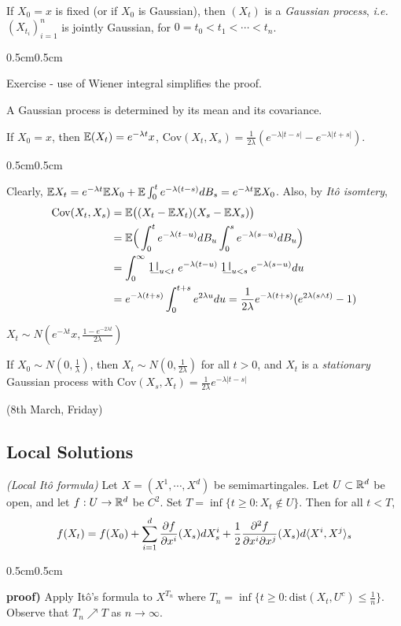 \documentclass[12pt,a4paper]{article}
\newenvironment{proof}
{\begin{changemargin}{0.5cm}{0.5cm} 
	}%
	{\end{changemargin}
}
\newenvironment{p}
{\begin{proof} 
	}%
	{\end{proof}
}
\begin{document}
\fact If $X_0 =x$ is fixed (or if $X_0$ is Gaussian), then $(X_t)$ is a \emph{Gaussian process}, \textit{i.e.} $(X_{t_i})_{i=1}^n$ is jointly Gaussian, for $0=t_0 < t_1 <\cdots <t_n$.
\begin{p}
\pf Exercise - use of Wiener integral simplifies the proof.
\end{p}
\s

A Gaussian process is determined by its mean and its covariance.
\s

\fact If $X_0 =x$, then $\mathbb{E}(X_t) = e^{-\lambda t} x$, $\text{Cov}(X_t, X_s) = \frac{1}{2\lambda} (e^{-\lambda |t-s|}- e^{-\lambda |t+s|})$.
\begin{p}
\pf Clearly, $\mathbb{E} X_t = e^{-\lambda t} \mathbb{E} X_0 + \mathbb{E} \int_0^t e^{-\lambda (t-s)}dB_s = e^{-\lambda t} \mathbb{E} X_0$. Also, by \emph{It\^o isomtery},
\begin{align*}
\text{Cov}(X_t, X_s) &= \avg \big( (X_t -\avg X_t)(X_s -\avg X_s) \big) \\
&= \avg \Big( \int_0^t e^{-\lambda (t-u)} dB_u \int_0^s e^{-\lambda (s-u)} dB_u \Big) \\
&= \int_0^{\infty} \charac_{u<t} e^{-\lambda (t-u)} \charac_{u<s} e^{-\lambda (s-u)} du \\
&= e^{-\lambda(t+s)} \int_0^{t+s} e^{2\lambda u} du  = \frac{1}{2\lambda} e^{-\lambda(t+s)} (e^{2\lambda(s\wedge t)}-1)
\end{align*} 
\eop
\end{p}
\s

\corr $X_t \sim N (e^{-\lambda t}x, \frac{1-e^{-2\lambda t}}{2\lambda})$
\s

\fact If $X_0 \sim N(0, \frac{1}{\lambda})$, then $X_t \sim N(0, \frac{1}{2\lambda})$ for all $t>0$, and $X_t$ is a \emph{stationary} Gaussian process with $\text{Cov}(X_s, X_t) = \frac{1}{2\lambda}e^{-\lambda |t-s|}$
\s

\newday

(8th March, Friday)

\subsection{Local Solutions}

\prop \emph{(Local It\^o formula)} Let $X = (X^1, \cdots, X^d)$ be semimartingales. Let $U\subset \mathbb{R}^d$ be open, and let $f: U\rightarrow \mathbb{R}^d$ be $C^2$. Set $T =\inf\{ t\geq 0: X_t \not\in U\}$. Then for all $t<T$,
\begin{align*}
f(X_t) = f(X_0) + \sum_{i=1}^d \frac{\partial f}{\partial x^i} (X_s) dX_s^i + \frac{1}{2}\frac{\partial^2 f}{\partial x^i \partial x^j}(X_s) d\langle X^i, X^j \rangle_s
\end{align*}
\begin{p}
\textbf{proof)} Apply It\^o's formula to $X^{T_n}$ where $T_n = \inf\{ t\geq 0 : \text{dist}(X_t, U^c) \leq \frac{1}{n}\}$. Observe that $T_n \nearrow T$ as $n\rightarrow \infty$. 

\eop
\end{p}
\s
\end{document}
